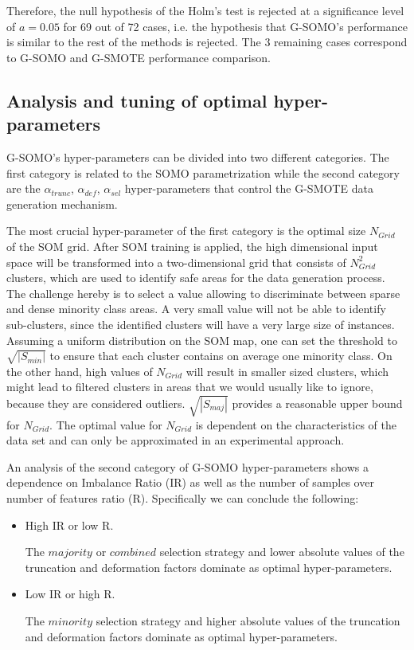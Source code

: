 \documentclass[parskip=full]{scrartcl}
\begin{document}
Therefore, the null hypothesis of the Holm's test is rejected at a significance
level of $a = 0.05$ for 69 out of 72 cases, i.e. the hypothesis that G-SOMO's performance is similar to the rest of the methods is rejected. The 3 remaining cases correspond to G-SOMO and G-SMOTE performance comparison.

\subsection{Analysis and tuning of optimal hyper-parameters}

G-SOMO's hyper-parameters can be divided into two different categories. The first category is related to the SOMO parametrization while the second category are the $\alpha_{trunc}$, $\alpha_{def}$, $\alpha_{sel}$ hyper-parameters that control the G-SMOTE data generation mechanism.

The most crucial hyper-parameter of the first category is the optimal size $N_{Grid}$ of the SOM grid. After SOM training is applied, the high dimensional input space will be transformed into a two-dimensional grid that consists of $N_{Grid}^2$ clusters, which are used to identify safe areas for the data generation process. The challenge hereby is to select a value allowing to discriminate between sparse and dense minority class areas.  A very small value will not be able to identify sub-clusters, since the identified clusters will have a very large size of instances. Assuming a uniform distribution on the SOM map, one can set the threshold to $\sqrt{|S_{min}|}$ to ensure that each cluster contains on average one minority class. On the other hand, high values of $N_{Grid}$ will result in smaller sized clusters, which might lead to filtered clusters in areas that we would usually like to ignore, because they are considered outliers. $\sqrt{|S_{maj}|}$ provides a reasonable upper bound for $N_{Grid}$. The optimal value for $N_{Grid}$ is dependent on the characteristics of the data set and can only be approximated in an experimental approach.

An analysis of the second category of G-SOMO hyper-parameters shows a dependence on Imbalance Ratio (IR) as well as the number of samples over number of features ratio (R). Specifically we can conclude the following:

\begin{itemize}

	\renewcommand\labelitemi{--}

	\item High IR or low R.
	
	The $ majority $ or $ combined $ selection strategy and lower absolute values of the truncation and deformation factors dominate as optimal hyper-parameters.

	\item Low IR or high R.
	
	The $ minority $ selection strategy and higher absolute values of the truncation and deformation factors dominate as optimal hyper-parameters.

\end{itemize}
\end{document}
